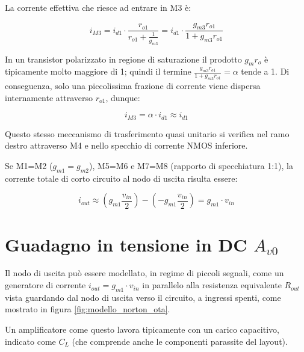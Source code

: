 \documentclass[12pt,a4paper,twoside]{report}
\begin{document}
\noindent La corrente effettiva che riesce ad entrare in M3 è:

$$i_{M3} = i_{d1} \cdot \frac{r_{o1}}{r_{o1} + \frac{1}{g_{m3}}} = i_{d1} \cdot \frac{g_{m3} r_{o1}}{1 + g_{m3} r_{o1}}$$

\vspace{0.3cm}

\noindent In un transistor polarizzato in regione di saturazione il prodotto $g_m r_o$ è tipicamente molto maggiore di 1; quindi il termine  $\frac{g_{m3} r_{o1}}{1 + g_{m3} r_{o1}}=\alpha$ tende a 1. Di conseguenza, solo una piccolissima frazione di corrente viene dispersa internamente attraverso $r_{o1}$, dunque:

$$i_{M3} = \alpha \cdot i_{d1} \approx i_{d1}$$

\noindent Questo stesso meccanismo di trasferimento quasi unitario si verifica nel ramo destro attraverso M4 e nello specchio di corrente NMOS inferiore.

\noindent Se M1=M2 ($g_{m1}=g_{m2}$), M5=M6 e M7=M8 (rapporto di specchiatura 1:1), la corrente totale di corto circuito al nodo di uscita risulta essere:

$$i_{out} \approx \left( g_{m1} \frac{v_{in}}{2} \right) - \left( -g_{m1} \frac{v_{in}}{2} \right) = g_{m1} \cdot v_{in}$$

\section{Guadagno in tensione in DC $A_{v0}$}
\label{chap:guadagno}

Il nodo di uscita può essere modellato, in regime di piccoli segnali, come un generatore di corrente $i_{out} = g_{m1} \cdot v_{in}$ in parallelo alla resistenza equivalente $R_{out}$ vista guardando dal nodo di uscita verso il circuito, a ingressi spenti, come mostrato in figura \ref{fig:modello_norton_ota}.

Un amplificatore come questo lavora tipicamente con un carico capacitivo, indicato come $C_L$ (che comprende anche le componenti parassite del layout). 
\end{document}
